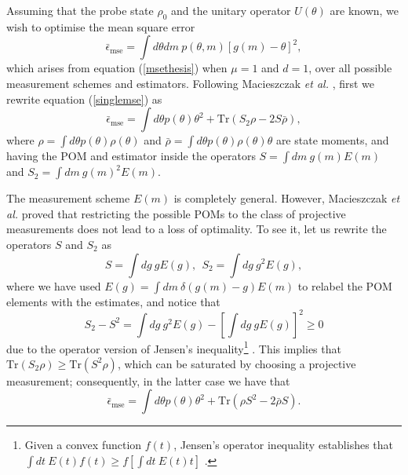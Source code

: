 Assuming that the probe state $\rho_0$ and the unitary operator $U(\theta)$ are known, we wish to optimise the mean square error
\begin{equation}
\bar{\epsilon}_{\mathrm{mse}} = \int d\theta dm~p(\theta,m) \left[g(m)-\theta\right]^2,
\label{singlemse}
\end{equation}
which arises from equation (\ref{msethesis}) when $\mu = 1$ and $d = 1$, over all possible measurement schemes and estimators. Following Macieszczak \emph{et al.} \cite{macieszczak2014bayesian}, first we rewrite equation (\ref{singlemse}) as 
\begin{equation}
\bar{\epsilon}_{\mathrm{mse}} = \int d\theta p(\theta) \theta^2 + \mathrm{Tr}(S_2 \rho - 2 S \bar{\rho}),
\label{mseqform}
\end{equation}
where $\rho = \int d\theta p(\theta)\rho(\theta)$ and $\bar{\rho} = \int d\theta p(\theta)\rho(\theta) \theta$ are state moments, and having the POM and estimator inside the operators $S = \int dm~ g(m)E(m)$ and $S_2 = \int dm~ g(m)^2E(m)$. 

The measurement scheme $E(m)$ is completely general. However,  Macieszczak \emph{et al.} \cite{macieszczak2014bayesian} proved that restricting the possible POMs to the class of projective measurements does not lead to a loss of optimality. To see it, let us rewrite the operators $S$ and $S_2$ as
\begin{equation}
S = \int dg~g E(g), ~~S_2 = \int dg~g^2 E(g),
\end{equation}
where we have used $E(g) = \int dm~\delta(g(m)-g) E(m)$ to relabel the POM elements with the estimates, and notice that 
\begin{equation}
S_2 - S^2 = \int dg~g^2 E(g) - \left[\int dg~g E(g)\right]^2 \geqslant 0
\end{equation}
due to the operator version of Jensen's inequality\footnote{Given a convex function $f(t)$, Jensen's operator inequality establishes that $\int dt~E(t)f(t) \geqslant f\left[\int dt~E(t)t\right] $ \cite{hansen2003, macieszczak2014bayesian}.} \cite{hansen2003, macieszczak2014bayesian}. This implies that $\mathrm{Tr}(S_2 \rho) \geqslant \mathrm{Tr}(S^2 \rho)$, which can be saturated by choosing a projective measurement; consequently, in the latter case we have that
\begin{equation}
\bar{\epsilon}_{\mathrm{mse}} = \int d\theta p(\theta) \theta^2 + \mathrm{Tr}\left(\rho S^2 - 2\bar{\rho}S\right).
\label{quantumse}
\end{equation}

